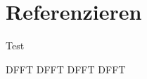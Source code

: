 \documentclass[a4paper, ngerman, oneside, 10pt]{article}
\begin{document}
\section{Referenzieren}\label{sec:ref}
Test \cite{Kleiner.2022}

\ac{DFFT}	%
\ac{DFFT}	%
\acf{DFFT}	%
\acs{DFFT}	%


%
\listoffigures
\listoftables
\printbibliography


\end{document}
